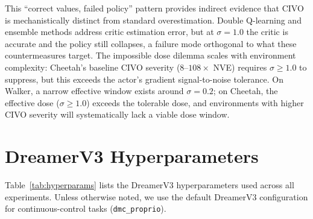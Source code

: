 This ``correct values, failed policy'' pattern provides indirect evidence that CIVO is mechanistically distinct from standard overestimation. Double Q-learning and ensemble methods address critic estimation error, but at $\sigma{=}1.0$ the critic is accurate and the policy still collapses, a failure mode orthogonal to what these countermeasures target. The impossible dose dilemma scales with environment complexity: Cheetah's baseline CIVO severity ($8$--$108\times$ NVE) requires $\sigma \geq 1.0$ to suppress, but this exceeds the actor's gradient signal-to-noise tolerance. On Walker, a narrow effective window exists around $\sigma{=}0.2$; on Cheetah, the effective dose ($\sigma \geq 1.0$) exceeds the tolerable dose, and environments with higher CIVO severity will systematically lack a viable dose window.

\section{DreamerV3 Hyperparameters}
\label{sec:hyperparameters}

Table~\ref{tab:hyperparams} lists the DreamerV3 hyperparameters used across all experiments. Unless otherwise noted, we use the default DreamerV3 configuration for continuous-control tasks (\texttt{dmc\_proprio}).

